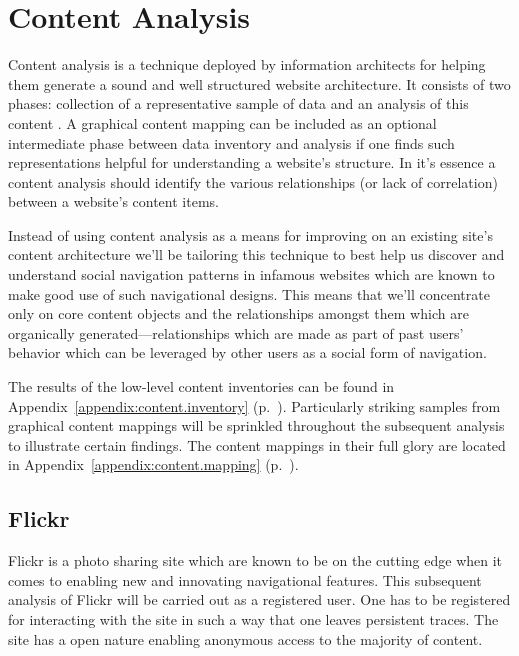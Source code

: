 \chapter{Content Analysis}

Content analysis is a technique deployed by information architects for helping
them generate a sound and well structured website architecture. It consists of
two phases: collection of a representative sample of data and an analysis of
this content \citep[pp.~241--243]{morville06}.
A graphical content mapping can be included as an optional
intermediate phase between data inventory and analysis if one finds such
representations helpful for understanding a website's structure.
In it's essence a content analysis should identify the various
relationships (or lack of correlation) between a website's content items.

Instead of using content analysis as a means for improving on an existing
site's content architecture we'll be tailoring this technique to best help us
discover and understand social navigation patterns in infamous websites which
are known to make good use of such navigational designs. This means that we'll
concentrate only on core content objects and the relationships amongst them
which are organically generated---relationships which are made as part of
past users' behavior which can be leveraged by other users as a social form
of navigation.

The results of the low-level content inventories can be found in
Appendix~\ref{appendix:content.inventory}
(p.~\pageref{appendix:content.inventory}).
Particularly striking
samples from graphical content mappings will be sprinkled throughout the
subsequent analysis to illustrate certain findings. The content mappings in
their full glory are located in
Appendix~\ref{appendix:content.mapping}
(p.~\pageref{appendix:content.mapping}).

\section{Flickr}

Flickr is a photo sharing site which are known to be on the cutting edge when
it comes to enabling new and innovating navigational features. This subsequent
analysis of Flickr will be carried out as a registered user. One has to be
registered for interacting with the site in such a way that one leaves
persistent traces. The site has a open nature enabling anonymous access
to the majority of content.

